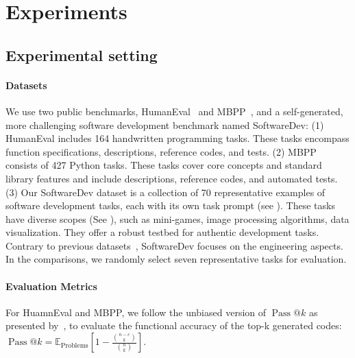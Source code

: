 \section{Experiments}
\label{sec:exp}
\subsection{Experimental setting}

\paragraph{Datasets} %
We use two public benchmarks, HumanEval~\citep{chen2021evaluating} and MBPP~\citep{austin2021program}, and a self-generated, more challenging software development benchmark named SoftwareDev: (1) HumanEval includes 164 handwritten programming tasks. These tasks encompass function specifications, descriptions, reference codes, and tests.  (2) MBPP consists of 427 Python tasks. These tasks cover core concepts and standard library features and include descriptions, reference codes, and automated tests. 
%
(3) Our SoftwareDev dataset is a collection of 70 representative examples of software development tasks, each with its own task prompt (see ). These tasks have diverse scopes (See ), such as mini-games, image processing algorithms, data visualization. 
%
They offer a robust testbed for authentic development tasks. Contrary to previous datasets~\citep{chen2021evaluating,austin2021program}, SoftwareDev focuses on the engineering aspects. In the comparisons, we randomly select seven representative tasks for evaluation. 

\paragraph{Evaluation Metrics}
For HuamnEval and MBPP, we follow the unbiased version of $\operatorname{Pass} @ k$ as presented by~\citep{chen2021evaluating,dong2023self}, to evaluate the functional accuracy of the top-k generated codes:  \(
\operatorname{Pass} @ k = {\mathbb{E}}_{\text{Problems}}\left[1 - \frac{{\binom{n-c}{k}}}{{\binom{n}{k}}}\right]
\). 

